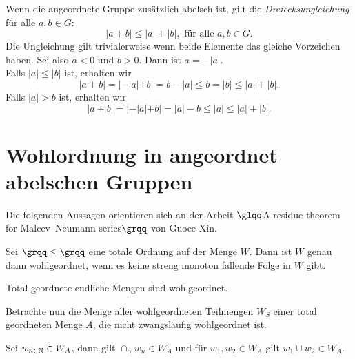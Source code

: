Wenn die angeordnete Gruppe zusätzlich abelsch ist, gilt die \textit{Dreiecksungleichung} für alle $a, b \in G$:
\[|a+ b | \le |a| + |b|, \text{ für alle } a, b \in G.\]
Die Ungleichung gilt trivialerweise wenn beide Elemente das gleiche Vorzeichen haben. Sei also $a < 0$ und $b > 0$. Dann ist $a= -|a|$.\\
Falls $|a|\le |b|$ ist, erhalten wir
\[ |a + b |= |-|a|+b| = b - |a| \le b = |b|\le|a| + |b|. \]
Falls $|a| >b$ ist, erhalten wir 
\[|a+b| = |-|a| +b| = |a| - b \le |a|\le |a| + |b|.\]                                                                                                                       
%

\section{Wohlordnung in angeordnet abelschen Gruppen}
Die folgenden Aussagen orientieren sich an der Arbeit $\glqq$A residue theorem for Malcev--Neumann series$\grqq$ von Guoce Xin.
\begin{satz}\label{wohlgeordnetabnehmendeFolge} 
Sei $\grqq\le\grqq$ eine totale Ordnung auf der Menge $W$. Dann ist $W$ genau dann wohlgeordnet, wenn es keine streng monoton fallende Folge in $W$ gibt.
\end{satz}
%
\begin{bsp}
Total geordnete endliche Mengen sind wohlgeordnet.
\end{bsp}
Betrachte nun die Menge aller wohlgeordneten Teilmengen $W_S$ einer total geordneten Menge $A$, die nicht zwangsläufig wohlgeordnet ist. 
\begin{lemma}\label{wohlgeordnvereinigung} %
Sei $w_{n\in \mathbb{N}} \in W_A$, dann gilt $\cap_\alpha w_n \in W_A$ und für $w_1, w_2 \in W_A$ gilt $w_1 \cup w_2 \in W_A$.
\end{lemma}
